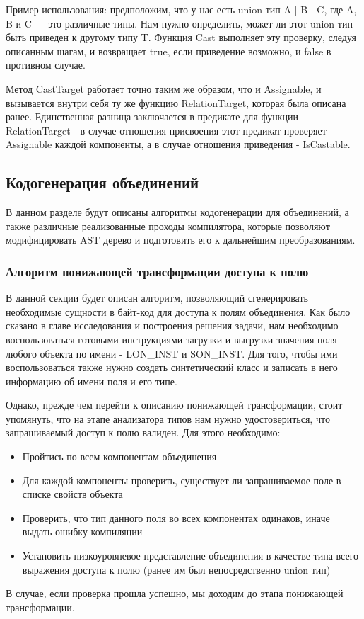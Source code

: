 Пример использования:
предположим, что у нас есть union тип A | B | C, где A, B и C — это различные типы.
Нам нужно определить, может ли этот union тип быть приведен к другому типу T.
Функция Cast выполняет эту проверку, следуя описанным шагам, и возвращает true, если приведение возможно, и
false в противном случае.

Метод CastTarget работает точно таким же образом, что и Assignable, и вызывается внутри себя ту же функцию RelationTarget,
которая была описана ранее.
Единственная разница заключается в предикате для функции RelationTarget - в случае отношения присвоения этот предикат
проверяет Assignable каждой компоненты, а в случае отношения приведения - IsCastable.

\subsection{Кодогенерация объединений}

В данном разделе будут описаны алгоритмы кодогенерации для объединений, а также различные реализованные
проходы компилятора, которые позволяют модифицировать AST дерево и подготовить его к дальнейшим преобразованиям.

\subsubsection{Алгоритм понижающей трансформации доступа к полю}

В данной секции будет описан алгоритм, позволяющий сгенерировать необходимые сущности в байт-код для доступа к полям
объединения.
Как было сказано в главе исследования и построения решения задачи, нам необходимо воспользоваться готовыми инструкциями
загрузки и выгрузки значения поля любого объекта по имени - LON\_INST и SON\_INST\@.
Для того, чтобы ими воспользоваться также нужно создать синтетический класс и записать в него информацию об имени поля
и его типе.

Однако, прежде чем перейти к описанию понижающей трансформации, стоит упомянуть, что на этапе анализатора типов нам
нужно удостовериться, что запрашиваемый доступ к полю валиден.
Для этого необходимо:
\begin{itemize}[left=2em]
    \item Пройтись по всем компонентам объединения
    \item Для каждой компоненты проверить, существует ли запрашиваемое поле в списке свойств объекта
    \item Проверить, что тип данного поля во всех компонентах одинаков, иначе выдать ошибку компиляции
    \item Установить низкоуровневое представление объединения в качестве типа всего выражения доступа к полю (ранее им
    был непосредственно union тип)
\end{itemize}
В случае, если проверка прошла успешно, мы доходим до этапа понижающей трансформации.

